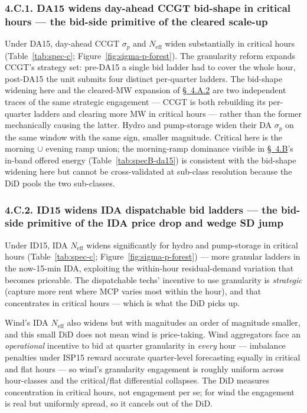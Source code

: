 \documentclass[11pt]{article}
\begin{document}
\subsubsection*{4.C.1. DA15 widens day-ahead CCGT bid-shape in critical hours --- the bid-side primitive of the cleared scale-up}\label{sec:4i}
Under DA15, day-ahead CCGT $\sigma_p$ and $N_{\text{eff}}$ widen substantially in critical hours (Table~\ref{tab:spec-c}; Figure~\ref{fig:sigma-p-forest}). The granularity reform expands CCGT's strategy set: pre-DA15 a single bid ladder had to cover the whole hour, post-DA15 the unit submits four distinct per-quarter ladders. The bid-shape widening here and the cleared-MW expansion of \hyperref[sec:4iii]{\S~4.A.2} are two independent traces of the same strategic engagement --- CCGT is both rebuilding its per-quarter ladders and clearing more MW in critical hours --- rather than the former mechanically causing the latter. Hydro and pump-storage widen their DA $\sigma_p$ on the same window with the same sign, smaller magnitude. Critical here is the morning $\cup$ evening ramp union; the morning-ramp dominance visible in \hyperref[sec:4-specB]{\S~4.B}'s in-band offered energy (Table~\ref{tab:specB-da15}) is consistent with the bid-shape widening here but cannot be cross-validated at sub-class resolution because the DiD pools the two sub-classes.

\subsubsection*{4.C.2. ID15 widens IDA dispatchable bid ladders --- the bid-side primitive of the IDA price drop and wedge SD jump}\label{sec:4-c-id15-ida}
Under ID15, IDA $N_{\text{eff}}$ widens significantly for hydro and pump-storage in critical hours (Table~\ref{tab:spec-c}; Figure~\ref{fig:sigma-p-forest}) --- more granular ladders in the now-15-min IDA, exploiting the within-hour residual-demand variation that becomes priceable. The dispatchable techs' incentive to use granularity is \emph{strategic} (capture more rent where MCP varies most within the hour), and that concentrates in critical hours --- which is what the DiD picks up.

Wind's IDA $N_{\text{eff}}$ also widens but with magnitudes an order of magnitude smaller, and this small DiD does not mean wind is price-taking. Wind aggregators face an \emph{operational} incentive to bid at quarter granularity in \emph{every} hour --- imbalance penalties under ISP15 reward accurate quarter-level forecasting equally in critical and flat hours --- so wind's granularity engagement is roughly uniform across hour-classes and the critical/flat differential collapses. The DiD measures concentration in critical hours, not engagement per se; for wind the engagement is real but uniformly spread, so it cancels out of the DiD.
\end{document}
